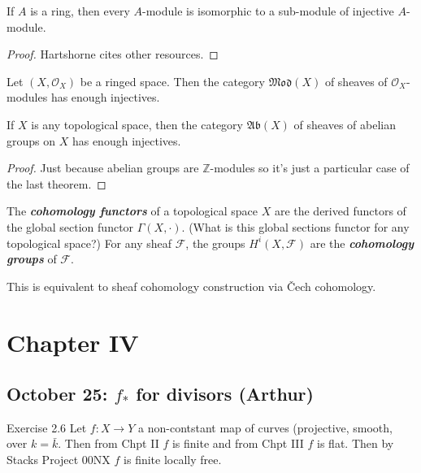 \begin{prop}
	If $A$ is a ring, then every $A$-module is isomorphic to a sub-module of injective $A$-module.
\end{prop}

\begin{proof}
	Hartshorne cites other resources.
\end{proof}

\begin{prop}
	Let  $(X,\mathcal{O}_X)$ be a ringed space. Then the category $\mathfrak{Mod}(X)$ of sheaves of $\mathcal{O}_X$-modules has enough injectives.
\end{prop}

\begin{coro}
	If $X$ is any topological space, then the category $\mathfrak{Ab}(X)$ of sheaves of abelian groups on $X$ has enough injectives.
\end{coro}

\begin{proof}
	Just because abelian groups are $\mathbb{Z}$-modules so it's just a particular case of the last theorem.
\end{proof}

\begin{defn}
	The \textit{\textbf{cohomology functors}} of a topological space $X$ are the derived functors of the global section functor $\Gamma(X,\cdot)$. {\color{magenta}(What is this global sections functor for any topological space?)} For any sheaf $\mathcal{F}$, the groups $H^{i}(X,\mathcal{F})$ are the \textit{\textbf{cohomology groups}} of  $\mathcal{F}$.
\end{defn}

\begin{remark}
	This is equivalent to sheaf cohomology construction via \v Cech cohomology.
\end{remark}

\chapter{Chapter IV}

\section{October 25: $f_*$ for divisors (Arthur)}

\begin{thing4}{Exercise 2.6}\leavevmode
	Let $f: X \to Y $ a non-contstant map of curves (projective, smooth, over $k=\bar{k}$. Then from Chpt II $f$ is finite and from Chpt III $f$ is flat. Then by Stacks Project 00NX  $f$ is finite locally free.
\end{thing4}

